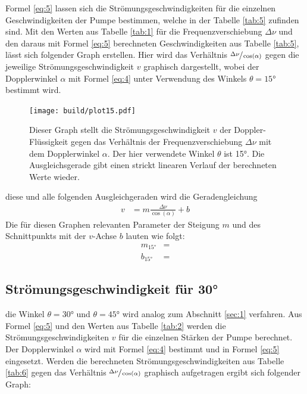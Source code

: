     \justifying Formel \eqref{eq:5} lassen sich die Strömungsgeschwindigkeiten für die einzelnen Geschwindigkeiten der Pumpe bestimmen, welche in der Tabelle \ref{tab:5}
    zufinden sind. Mit den Werten aus Tabelle \ref{tab:1} für die Frequenzverschiebung $\Delta\nu$ und den daraus mit Formel \eqref{eq:5} berechneten Geschwindigkeiten aus Tabelle \ref{tab:5}, 
    lässt sich folgender Graph erstellen. Hier wird das Verhältnis $\sfrac{\Delta\nu}{\cos(\alpha)}$ gegen die jeweilige Strömungsgeschwindigkeit $v$ graphisch dargestellt, wobei der 
    Dopplerwinkel $\alpha$ mit Formel \eqref{eq:4} unter Verwendung des Winkels $\theta=15°$ bestimmt wird. 

\begin{figure}[H]
    \centering
    \texttt{[image: build/plot15.pdf]}
    \caption{Dieser Graph stellt die Strömungsgeschwindigkeit $v$ der Doppler-Flüssigkeit gegen das Verhältnis der Frequenzverschiebung $\Delta\nu$ mit dem Dopplerwinkel $\alpha$. 
    Der hier verwendete Winkel $\theta$ ist 15°. Die Ausgleichsgerade gibt einen strickt linearen Verlauf der berechneten Werte wieder.}
    \label{fig:5}
\end{figure}

    \justifying diese und alle folgenden Ausgleichgeraden wird die Geradengleichung 
    \begin{align}
        v &= m \frac{\Delta\nu}{\cos(\alpha)} + b \label{eq:6}
    \end{align}
    \justifying
    Die für diesen Graphen relevanten Parameter der Steigung $m$ und des Schnittpunkts mit der $v$-Achse $b$ lauten wie folgt:
    \begin{align}
        m_{15°} &= \text{} \label{eq:7}\\
        b_{15°} &= \text{} \label{eq:8}
    \end{align}

\newpage
\subsection{Strömungsgeschwindigkeit für 30°}

    \justifying die Winkel $\theta=30°$ und $\theta=45°$ wird analog zum Abschnitt \ref{sec:1} verfahren. Aus Formel \eqref{eq:5} und den Werten aus Tabelle \ref{tab:2}
    werden die Strömungsgeschwindigkeiten $v$ für die einzelnen Stärken der Pumpe berechnet. Der Dopplerwinkel $\alpha$ wird mit Formel \eqref{eq:4} bestimmt und in Formel \eqref{eq:5}
    eingesetzt. Werden die berechneten Strömungsgeschwindigkeiten aus Tabelle \ref{tab:6} gegen das Verhältnis $\sfrac{\Delta\nu}{\cos(\alpha)}$ graphisch aufgetragen ergibt sich folgender Graph:

